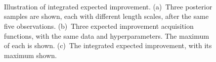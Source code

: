 \documentclass[aos,preprint]{imsart}
\begin{document}
\begin{figure}[t]
  \centering
  \begin{minipage}[t]{0.49\textwidth}
  \centering
  \\
  \\
  \caption{{\small Illustration of integrated expected improvement. (a)~Three
    posterior samples are shown, each with different length scales,
    after the same five observations.  (b)~Three expected improvement
    acquisition functions, with the same data and hyperparameters. The
    maximum of each is shown. (c)~The integrated expected improvement,
    with its maximum shown.}}
  \label{fig:illust-hyper}
  \end{minipage}~\quad
  \begin{minipage}[t]{0.49\textwidth}
  \centering

\end{minipage}
\end{figure}
\end{document}
